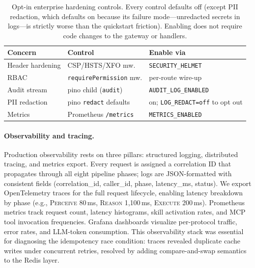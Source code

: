 \documentclass[11pt]{article}
\begin{document}
\begin{table}[t]
  \small
  \centering
  \begin{tabular}{lll}
    \toprule
    Concern & Control & Enable via \\
    \midrule
    Header hardening  & CSP/HSTS/XFO mw.   & \texttt{SECURITY\_HELMET} \\
    RBAC              & \texttt{requirePermission} mw. & per-route wire-up \\
    Audit stream      & pino child (\texttt{audit}) & \texttt{AUDIT\_LOG\_ENABLED} \\
    PII redaction     & pino \texttt{redact} defaults & on; \texttt{LOG\_REDACT=off} to opt out \\
    Metrics           & Prometheus \texttt{/metrics} & \texttt{METRICS\_ENABLED} \\
    \bottomrule
  \end{tabular}
  \caption{Opt-in enterprise hardening controls. Every control defaults off (except PII redaction, which defaults on because its failure mode---unredacted secrets in logs---is strictly worse than the quickstart friction). Enabling does not require code changes to the gateway or handlers.}
  \label{tab:hardening}
\end{table}

\paragraph{Observability and tracing.} Production observability rests on three pillars: structured logging, distributed tracing, and metrics export. Every request is assigned a correlation ID that propagates through all eight pipeline phases; logs are JSON-formatted with consistent fields (correlation\_id, caller\_id, phase, latency\_ms, status). We export OpenTelemetry traces for the full request lifecycle, enabling latency breakdown by phase (e.g., \textsc{Perceive} 80\,ms, \textsc{Reason} 1,100\,ms, \textsc{Execute} 200\,ms). Prometheus metrics track request count, latency histograms, skill activation rates, and MCP tool invocation frequencies. Grafana dashboards visualize per-protocol traffic, error rates, and LLM-token consumption. This observability stack was essential for diagnosing the idempotency race condition: traces revealed duplicate cache writes under concurrent retries, resolved by adding compare-and-swap semantics to the Redis layer.
\end{document}
